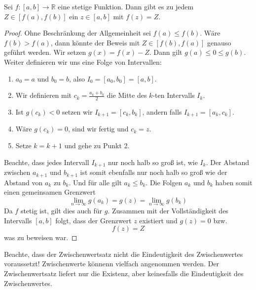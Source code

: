 \begin{satz}[Zwischenwertsatz]\label{satz:zwischen}
Sei $f:[a,b]\longrightarrow \mathbb{R}$ eine stetige Funktion. Dann gibt es zu jedem $Z\in[f(a),f(b)]$ ein $z\in [a,b]$ mit $f(z)=Z$.
\end{satz}
\begin{proof}
Ohne Beschränkung der Allgemeinheit sei $f(a)\le f(b)$. Wäre $f(b)>f(a)$, dann könnte der Beweis mit $Z\in[f(b),f(a)]$ genauso geführt werden. Wir setzen $g(x) = f(x)-Z$. Dann gilt $g(a)\le 0 \le g(b)$. Weiter definieren wir uns eine Folge von Intervallen:

\begin{enumerate}
\item $a_0 = a$ und $b_0 = b$, also $I_0 = [a_0,b_0]=[a,b]$.
\item Wir definieren mit $c_k = \frac{a_k +b_k}{2}$ die Mitte des $k$-ten Intervalls $I_k$.
\item Ist $g(c_k)<0$ setzen wir $I_{k+1} = [c_k,b_k]$, andern falls $I_{k+1}=[a_k,c_k]$.
\item Wäre $g(c_k)=0$, sind wir fertig und $c_k=z$.
\item Setze $k=k+1$ und gehe zu Punkt 2.
\end{enumerate}
Beachte, dass jedes Intervall $I_{k+1}$ nur noch halb so groß ist, wie $I_k$. Der Abstand zwischen $a_{k+1}$ und $b_{k+1}$ ist somit ebenfalls nur noch halb so groß wie der Abstand von $a_k$ zu $b_k$. Und für alle gilt $a_k\le b_k$. Die Folgen $a_k$ und $b_k$ haben somit einen gemeinsamen Grenzwert
\begin{equation}
\lim_{n\rightarrow \infty} g(a_k) =g(z)=\lim_{n\rightarrow \infty} g(b_k)
\end{equation}
Da $f$ stetig ist, gilt dies auch für $g$. Zusammen mit der Vollständigkeit des Intervalls $[a,b]$ folgt, dass der Grenzwert $z$ existiert und $g(z)=0$ bzw.
\begin{equation}
f(z)=Z
\end{equation}
was zu beweisen war.
\end{proof}

\begin{remark}
Beachte, dass der Zwischenwertsatz nicht die Eindeutigkeit des Zwischenwertes voraussetzt! Zwischenwerte könnenn vielfach angenommen werden. Der Zwischenwertsatz liefert nur die Existenz, aber keinesfalls die Eindeutigkeit des Zwischenwertes.
\end{remark}
